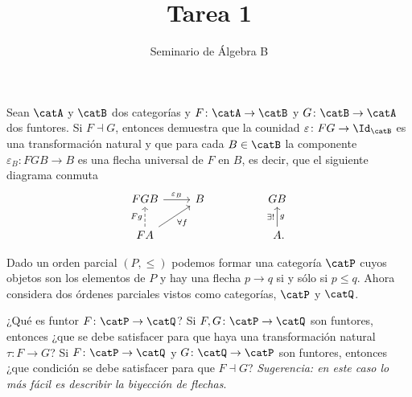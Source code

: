 \documentclass[article]{memoir}
\title{Tarea 1}
\author{Seminario de Álgebra B}
\date{}
\begin{document}
\maketitle

\begin{exercise}
Sean \(\catA\) y \(\catB\) dos categorías y \(F\colon\catA\to\catB\) y \(G\colon\catB\to\catA\) dos funtores. Si 
\(F\dashv G\), entonces demuestra que la counidad \(\varepsilon\colon FG\to \Id_{\catB}\) es una transformación natural y que para cada \(B\in\catB\) la componente \(\varepsilon_B\colon FGB\to B\) es una flecha universal de \(F\) en \(B\), es decir, que el siguiente diagrama conmuta
\[
  \begin{tikzcd}[ampersand replacement=\&]
    FGB\ar{r}{\varepsilon_B} \& B \&\& GB\\
    FA\ar{ru}[swap]{\forall f}\ar[dashed]{u}{Fg} \&\&\& A\mathrlap{.}\ar{u}{\exists !}[swap]{g}
  \end{tikzcd}
\]
\end{exercise}

\begin{exercise}
  Dado un orden parcial \((P,\leq)\) podemos formar una categoría \(\catP\) cuyos objetos son los elementos de \(P\) y hay una flecha \(p\to q\) si y sólo si \(p\leq q\). Ahora considera dos órdenes parciales vistos como categorías, \(\catP\) y \(\catQ\).
  \begin{tasks}
    \task ¿Qué es funtor \(F\colon\catP\to\catQ\)?
    \task Si \(F,G\colon\catP\to\catQ\) son funtores, entonces ¿que se debe satisfacer para que haya una transformación natural \(\tau\colon F\to G\)?
    \task Si \(F\colon\catP\to\catQ\) y \(G\colon\catQ\to\catP\) son funtores, entonces ¿que condición se debe satisfacer para que \(F\dashv G\)? \textit{Sugerencia: en este caso lo más fácil es describir la biyección de flechas}.
  \end{tasks}
\end{exercise}
\end{document}
